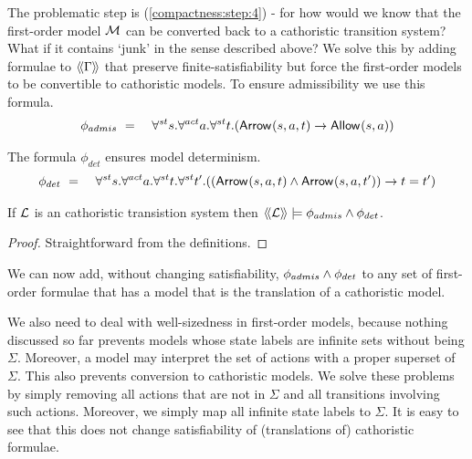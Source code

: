 \NI The problematic step is (\ref{compactness:step:4}) - for how would
we know that the first-order model $\mathcal{M}$ can be converted back to
a cathoristic transition system? What if it contains `junk' in the
sense described above?  
We solve this by adding formulae to 
$\langle\!\langle \Gamma \rangle\!\rangle$ that preserve finite-satisfiability but force the
first-order models to be convertible to cathoristic models.
 To ensure admissibility we use this formula.
\begin{eqnarray*}
   \phi_{admis} 
      & \ =\ &
   \forall^{st} s.\forall^{act} a.\forall^{st} t.( \mathsf{Arrow}^{}(s, a, t) \rightarrow \mathsf{Allow}^{}(s, a)) 
\end{eqnarray*}

\NI The formula $\phi_{det}$ ensures model determinism.
\begin{eqnarray*}
   \phi_{det} 
      & \ =\ &
   \forall^{st} s.\forall^{act} a.\forall^{st} t.\forall^{st} t'.
   ((\mathsf{Arrow}^{}(s, a, t)  \land \mathsf{Arrow}^{}(s, a, t') ) \rightarrow t = t' )   
\end{eqnarray*}

\begin{lemma}\label{compactness:lemma:23399}
If $\mathcal{L}$ is an cathoristic transistion system then $\langle\!\langle \mathcal{L} \rangle\!\rangle \models
\phi_{admis} \land \phi_{det}$.
\end{lemma}

\begin{proof}
Straightforward from the definitions.
\end{proof}

We can now add, without changing satisfiability, $\phi_{admis}
\land \phi_{det}$ to any set of first-order formulae that has a model
that is the translation of a cathoristic model.

We also need to deal with well-sizedness in first-order models,
because nothing discussed so far prevents models whose state labels are
infinite sets without being $\Sigma$.  Moreover, a model may interpret
the set of actions with a proper superset of $\Sigma$.  This also
prevents conversion to cathoristic models. We solve these problems by
simply removing all actions that are not in $\Sigma$ and all
transitions involving such actions.  Moreover, we simply map all
infinite state labels to $\Sigma$. It is easy to see that this does not
change satisfiability of (translations of) cathoristic formulae.



